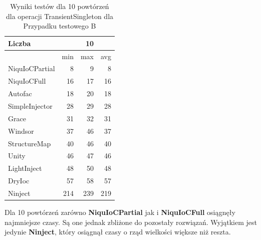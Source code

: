 \documentclass[12pt]{article}
\begin{document}
\begin{table}[H]
\captionsetup{belowskip=0pt,aboveskip=0pt}
\begin{center}
\begin{small}
	\begin{tabular}{ | l | r r r | }
    		\hline
Liczba & & 10 & \\ \hline
 & min & max & avg \\ \hline
NiquIoCPartial & 8 & 9 & 8 \\ \hline
NiquIoCFull & 16 & 17 & 16 \\ \hline
Autofac & 18 & 20 & 18 \\ \hline
SimpleInjector & 28 & 29 & 28 \\ \hline
Grace & 31 & 32 & 31 \\ \hline
Windsor & 37 & 46 & 37 \\ \hline
StructureMap & 40 & 46 & 40 \\ \hline
Unity & 46 & 47 & 46 \\ \hline
LightInject & 48 & 50 & 48 \\ \hline
DryIoc & 57 & 58 & 57 \\ \hline
Ninject & 214 & 239 & 219 \\ \hline
  	\end{tabular}
\end{small}
\end{center}
\caption{Wyniki testów dla 10 powtórzeń dla operacji TransientSingleton dla Przypadku testowego B}
\label{TestCaseB_TransientSingleton10}
\end{table}
Dla 10 powtórzeń zarówno \textbf{NiquIoCPartial} jak i \textbf{NiquIoCFull} osiągnęły najmniejsze czasy. Są one jednak zbliżone do pozostały rozwiązań. Wyjątkiem jest jedynie \textbf{Ninject}, który osiągnął czasy o rząd wielkości większe niż reszta.
\\ \\
\end{document}
